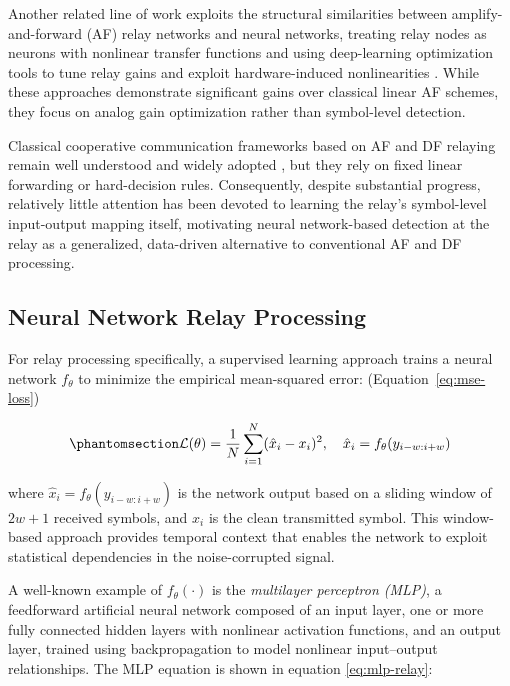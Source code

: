 Another related line of work exploits the structural similarities between amplify-and-forward (AF) relay networks and neural networks, treating relay nodes as neurons with nonlinear transfer functions and using deep-learning optimization tools to tune relay gains and exploit hardware-induced nonlinearities \cite{Bergel2023RelaysAsNeurons,BergelICASSP2024}. While these approaches demonstrate significant gains over classical linear AF schemes, they focus on analog gain optimization rather than symbol-level detection.

Classical cooperative communication frameworks based on AF and DF relaying remain well understood and widely adopted \cite{Nosratinia2004CooperativeCommunication}, but they rely on fixed linear forwarding or hard-decision rules. Consequently, despite substantial progress, relatively little attention has been devoted to learning the relay's symbol-level input-output mapping itself, motivating neural network-based detection at the relay as a generalized, data-driven alternative to conventional AF and DF processing.

\subsection{Neural Network Relay Processing}\label{sec:neural-network-relay-processing}

For relay processing specifically, a supervised learning approach trains a neural network \(f_\theta\) to minimize the empirical mean-squared error: (Equation~\ref{eq:mse-loss})

\begin{equation}\protect\phantomsection\label{eq:mse-loss}{\mathcal{L}(\theta) = \frac{1}{N} \sum_{i=1}^{N} (\hat{x}_i - x_i)^2, \quad \hat{x}_i = f_\theta(y_{i-w:i+w})
}\end{equation}

where \(\hat{x}_i = f_\theta(y_{i-w:i+w})\) is the network output based on a sliding window of \(2w+1\) received symbols, and \(x_i\) is the clean transmitted symbol. This window-based approach provides temporal context that enables the network to exploit statistical dependencies in the noise-corrupted signal.

A well-known example of \(f_\theta(\cdot)\) is the \emph{multilayer perceptron (MLP)}, a feedforward artificial neural network composed of an input layer, one or more fully connected hidden layers with nonlinear activation functions, and an output layer, trained using backpropagation to model nonlinear input--output relationships.
The MLP equation is shown in equation \ref{eq:mlp-relay}:

